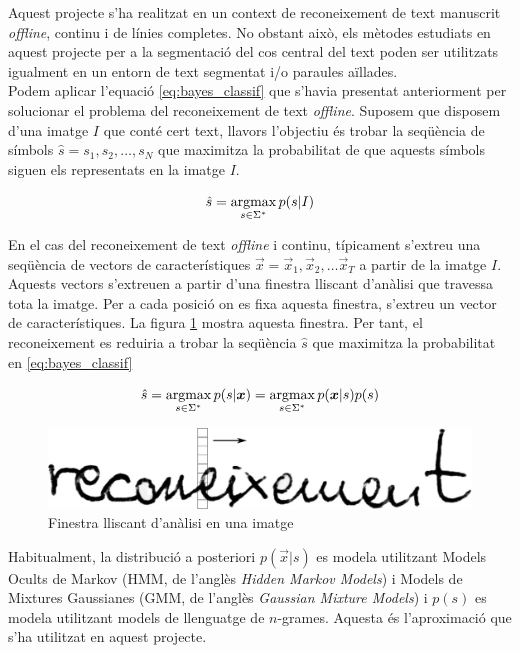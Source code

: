 Aquest projecte s'ha realitzat en un context de reconeixement de text manuscrit \emph{offline}, continu i de línies completes. No obstant això, els mètodes estudiats en aquest projecte per a la segmentació del cos central del text poden ser utilitzats igualment en un entorn de text segmentat i/o paraules aïllades.\\

Podem aplicar l'equació \ref{eq:bayes_classif} que s'havia presentat anteriorment per solucionar el problema del reconeixement de text \emph{offline}. Suposem que disposem d'una imatge $I$ que conté cert text, llavors l'objectiu és trobar la seqüència de símbols $\hat{s} = s_1, s_2, \ldots, s_N$ que maximitza la probabilitat de que aquests símbols siguen els representats en la imatge $I$.

\begin{equation}\label{eq:}
\hat{s} = \operatorname*{argmax}_{s \in \Sigma^*} p(s|I)
\end{equation}

En el cas del reconeixement de text \emph{offline} i continu, típicament s'extreu una seqüència de vectors de característiques $\vec{x} = \vec{x}_1, \vec{x}_2, \ldots \vec{x}_T$ a partir de la imatge $I$. Aquests vectors s'extreuen a partir d'una finestra lliscant d'anàlisi que travessa tota la imatge. Per a cada posició on es fixa aquesta finestra, s'extreu un vector de característiques. La figura \ref{fig:finestra_lliscant} mostra aquesta finestra. Per tant, el reconeixement es reduiria a trobar la seqüència $\hat{s}$ que maximitza la probabilitat en  \ref{eq:bayes_classif}

\begin{equation}\label{eq:bayes_classif_vectors}
\hat{s} = \argmax_{s \in \Sigma^*} p(s|\vec{x}) = \argmax_{s \in \Sigma^*} p(\vec{x}|s) p(s) %
\end{equation}

\begin{figure}
\centering
\includegraphics[width=\textwidth]{images/finestra_lliscant.eps}
\caption{Finestra lliscant d'anàlisi en una imatge}
\label{fig:finestra_lliscant}
\end{figure}

Habitualment, la distribució a posteriori $p(\vec{x}|s)$ es modela utilitzant Models Ocults de Markov (HMM, de l'anglès \emph{Hidden Markov Models}) i Models de Mixtures Gaussianes (GMM, de l'anglès \emph{Gaussian Mixture Models}) i $p(s)$ es modela utilitzant models de llenguatge de $n$-grames. Aquesta és l'aproximació que s'ha utilitzat en aquest projecte.